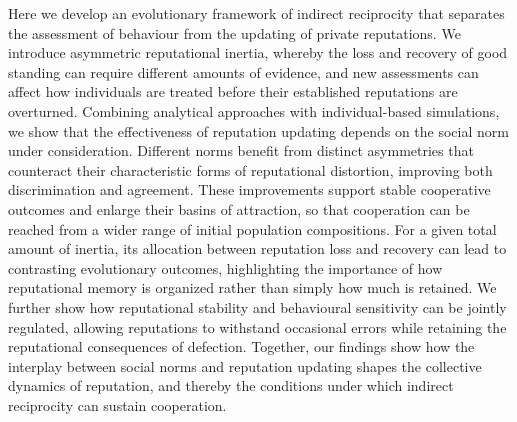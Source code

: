 Here we develop an evolutionary framework of indirect reciprocity that separates the assessment of behaviour from the updating of private reputations. We introduce asymmetric reputational inertia, whereby the loss and recovery of good standing can require different amounts of evidence, and new assessments can affect how individuals are treated before their established reputations are overturned. Combining analytical approaches with individual-based simulations, we show that the effectiveness of reputation updating depends on the social norm under consideration. Different norms benefit from distinct asymmetries that counteract their characteristic forms of reputational distortion, improving both discrimination and agreement. These improvements support stable cooperative outcomes and enlarge their basins of attraction, so that cooperation can be reached from a wider range of initial population compositions. For a given total amount of inertia, its allocation between reputation loss and recovery can lead to contrasting evolutionary outcomes, highlighting the importance of how reputational memory is organized rather than simply how much is retained. We further show how reputational stability and behavioural sensitivity can be jointly regulated, allowing reputations to withstand occasional errors while retaining the reputational consequences of defection. Together, our findings show how the interplay between social norms and reputation updating shapes the collective dynamics of reputation, and thereby the conditions under which indirect reciprocity can sustain cooperation.
